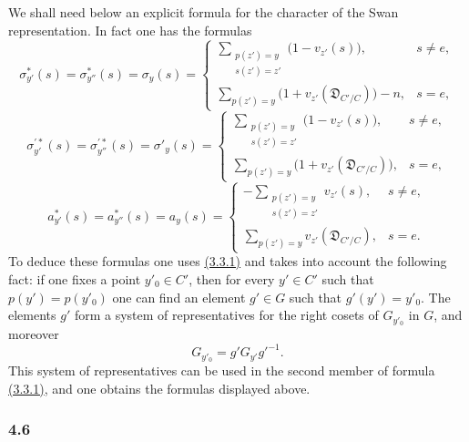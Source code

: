 \documentclass[11pt]{article}
\begin{document}
We shall need below an explicit formula for the character of the Swan representation. In fact one has the formulas
\[
\sigma^{*}_{y'}(s)=\sigma^{*}_{y''}(s)=\sigma_y(s)=
\begin{cases}
\displaystyle\sum_{\substack{p(z')=y\\s(z')=z'}}\bigl(1-v_{z'}(s)\bigr),& s\ne e,\\[0.8em]
\displaystyle\sum_{p(z')=y}\bigl(1+v_{z'}(\mathfrak D_{C'/C})\bigr)-n,& s=e,
\end{cases}
\tag{4.5.1}\label{sga5:X:equation:4.5.1}
\]
\[
\sigma^{\prime*}_{y'}(s)=\sigma^{\prime*}_{y''}(s)=\sigma'_y(s)=
\begin{cases}
\displaystyle\sum_{\substack{p(z')=y\\s(z')=z'}}\bigl(1-v_{z'}(s)\bigr),& s\ne e,\\[0.8em]
\displaystyle\sum_{p(z')=y}\bigl(1+v_{z'}(\mathfrak D_{C'/C})\bigr),& s=e,
\end{cases}
\tag{4.5.2}\label{sga5:X:equation:4.5.2}
\]
\[
a^{*}_{y'}(s)=a^{*}_{y''}(s)=a_y(s)=
\begin{cases}
\displaystyle-\sum_{\substack{p(z')=y\\s(z')=z'}}v_{z'}(s),& s\ne e,\\[0.8em]
\displaystyle\sum_{p(z')=y}v_{z'}(\mathfrak D_{C'/C}),& s=e.
\end{cases}
\tag{4.5.3}\label{sga5:X:equation:4.5.3}
\]
To deduce these formulas one uses \hyperref[sga5:X:equation:3.3.1]{(3.3.1)} and takes into account the following fact: if one fixes a point $y'_0\in C'$, then for every $y'\in C'$ such that $p(y')=p(y'_0)$ one can find an element $g'\in G$ such that $g'(y')=y'_0$. The elements $g'$ form a system of representatives for the right cosets of $G_{y'_0}$ in $G$, and moreover
\[
G_{y'_0}=g'G_{y'}g'^{-1}.
\]
This system of representatives can be used in the second member of formula \hyperref[sga5:X:equation:3.3.1]{(3.3.1)}, and one obtains the formulas displayed above.

\subsubsection*{4.6}\label{sga5:X:subsubsection:4.6}
\end{document}
